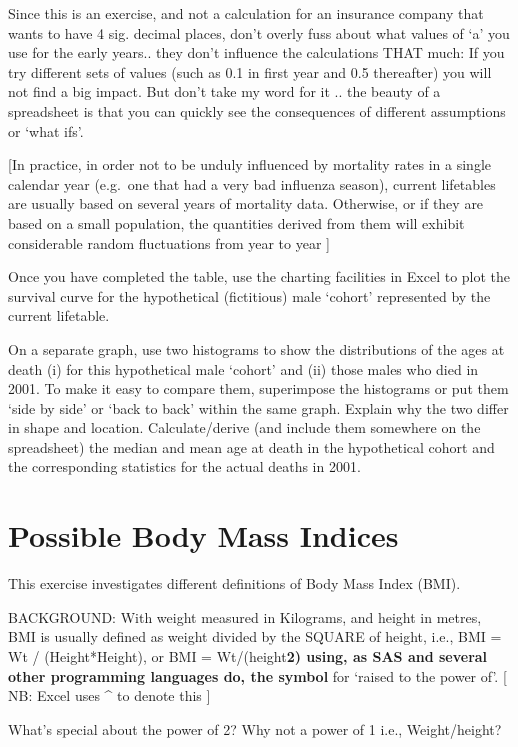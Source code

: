 \documentclass[]{book}
\begin{document}
Since this is an exercise, and not a calculation for an insurance company that wants to have 4 sig. decimal places, don't overly fuss about what values of `a' you use for the early years.. they don't influence the calculations THAT much: If you try different sets of values (such as 0.1 in first year and 0.5 thereafter) you will not find a big impact. But don't take my word for it .. the beauty of a spreadsheet is that you can quickly see the consequences of different assumptions or `what ifs'.

{[}In practice, in order not to be unduly influenced by mortality rates in a single calendar year (e.g.~one that had a very bad influenza season), current lifetables are usually based on several years of mortality data. Otherwise, or if they are based on a small population, the quantities derived from them will exhibit considerable random fluctuations from year to year {]}

Once you have completed the table, use the charting facilities in Excel to plot the survival curve for the hypothetical (fictitious) male `cohort' represented by the current lifetable.

On a separate graph, use two histograms to show the distributions of the ages at death (i) for this hypothetical male `cohort' and (ii) those males who died in 2001. To make it easy to compare them, superimpose the histograms or put them `side by side' or `back to back' within the same graph. Explain why the two differ in shape and location. Calculate/derive (and include them somewhere on the spreadsheet) the median and mean age at death in the hypothetical cohort and the corresponding statistics for the actual deaths in 2001.

\hypertarget{possible-body-mass-indices-1}{%
\section{Possible Body Mass Indices}\label{possible-body-mass-indices-1}}

This exercise investigates different definitions of Body Mass Index (BMI).

BACKGROUND: With weight measured in Kilograms, and height in metres, BMI is usually defined as weight divided by the SQUARE of height, i.e., BMI = Wt / (Height*Height), or BMI = Wt/(height\textbf{2) using, as SAS and several other programming languages do, the symbol } for `raised to the power of'. {[} NB: Excel uses \^{} to denote this {]}

What's special about the power of 2? Why not a power of 1 i.e., Weight/height?
\end{document}
